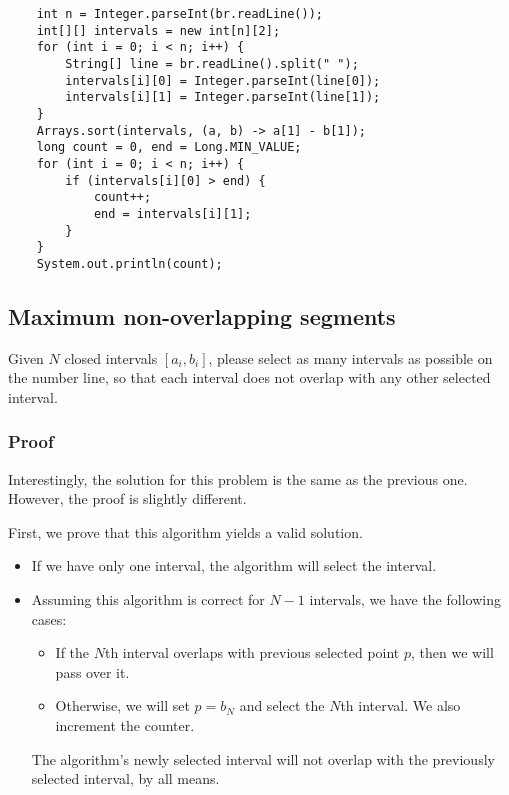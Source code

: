 \documentclass{article}
\begin{document}
\begin{verbatim}
    int n = Integer.parseInt(br.readLine());
    int[][] intervals = new int[n][2];
    for (int i = 0; i < n; i++) {
        String[] line = br.readLine().split(" ");
        intervals[i][0] = Integer.parseInt(line[0]);
        intervals[i][1] = Integer.parseInt(line[1]);
    }
    Arrays.sort(intervals, (a, b) -> a[1] - b[1]);
    long count = 0, end = Long.MIN_VALUE;
    for (int i = 0; i < n; i++) {
        if (intervals[i][0] > end) {
            count++;
            end = intervals[i][1];
        }
    }
    System.out.println(count);
\end{verbatim}

\subsection{Maximum non-overlapping segments}

Given $N$ closed intervals $[a_i,b_i]$, please select as many intervals as possible on the number line, so that each interval does not overlap with any other selected interval.

\subsubsection{Proof}

Interestingly, the solution for this problem is the same as the previous one. However, the proof is slightly different.

First, we prove that this algorithm yields a valid solution.

\begin{itemize}
    \item If we have only one interval, the algorithm will select the interval.
    \item Assuming this algorithm is correct for $N-1$ intervals, we have the following cases:

    \begin{itemize}
        \item If the $N$th interval overlaps with previous selected point $p$, then we will pass over it.
        \item Otherwise, we will set $p = b_N$ and select the $N$th interval. We also increment the counter.
    \end{itemize}

    The algorithm's newly selected interval will not overlap with the previously selected interval, by all means.
\end{itemize}
\end{document}
